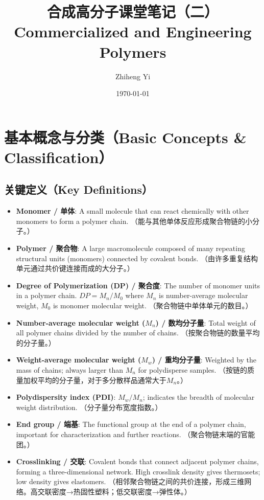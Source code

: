 \documentclass[12pt,a4paper]{ctexart}
\title{\textbf{合成高分子课堂笔记（二）}\\\large Commercialized and Engineering Polymers}
\author{Zhiheng Yi}
\date{\today}
\begin{document}
\maketitle
\tableofcontents

\section{基本概念与分类（Basic Concepts \& Classification）}

\subsection{关键定义（Key Definitions）}

\begin{itemize}[leftmargin=*]
    \item \textbf{Monomer / 单体}: A small molecule that can react chemically with other monomers to form a polymer chain. （能与其他单体反应形成聚合物链的小分子。）
    \item \textbf{Polymer / 聚合物}: A large macromolecule composed of many repeating structural units (monomers) connected by covalent bonds. （由许多重复结构单元通过共价键连接而成的大分子。）
    \item \textbf{Degree of Polymerization (DP) / 聚合度}: The number of monomer units in a polymer chain. $DP = M_n / M_0$ where $M_n$ is number-average molecular weight, $M_0$ is monomer molecular weight. （聚合物链中单体单元的数目。）
    \item \textbf{Number-average molecular weight ($M_n$) / 数均分子量}: Total weight of all polymer chains divided by the number of chains. （按聚合物链的数量平均的分子量。）
    \item \textbf{Weight-average molecular weight ($M_w$) / 重均分子量}: Weighted by the mass of chains; always larger than $M_n$ for polydisperse samples. （按链的质量加权平均的分子量，对于多分散样品通常大于$M_n$。）
    \item \textbf{Polydispersity index (PDI)}: $M_w / M_n$; indicates the breadth of molecular weight distribution. （分子量分布宽度指数。）
    \item \textbf{End group / 端基}: The functional group at the end of a polymer chain, important for characterization and further reactions. （聚合物链末端的官能团。）
    \item \textbf{Crosslinking / 交联}: Covalent bonds that connect adjacent polymer chains, forming a three-dimensional network. High crosslink density gives thermosets; low density gives elastomers. （相邻聚合物链之间的共价连接，形成三维网络。高交联密度→热固性塑料；低交联密度→弹性体。）

\end{itemize}
\end{document}
